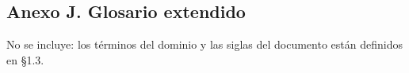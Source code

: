 \documentclass[10pt,a4paper]{article}
\begin{document}
\subsection*{Anexo J. Glosario extendido}
No se incluye: los términos del dominio y las siglas del documento están definidos en §1.3.

\end{document}
